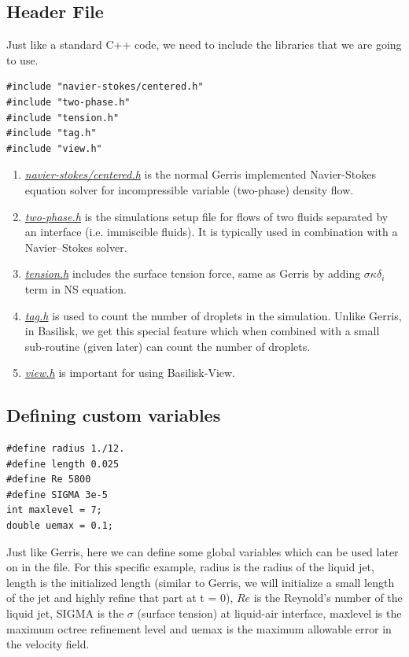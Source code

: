 \documentclass[]{article}
\newcommand\Colorhref[3][blue]{\href{#2}{\color{#1}#3}}
\begin{document}
\subsection{Header File}
Just like a standard C++ code, we need to include the libraries that we are going to use.
\begin{verbatim}
#include "navier-stokes/centered.h"
#include "two-phase.h"
#include "tension.h"
#include "tag.h"
#include "view.h"
\end{verbatim}
\begin{enumerate}
\item \Colorhref{http://basilisk.fr/src/navier-stokes/centered.h}{\textit{navier-stokes/centered.h}} is the normal Gerris implemented Navier-Stokes equation solver for incompressible variable (two-phase) density flow.
\item \Colorhref{http://basilisk.fr/src/two-phase.h}{\textit{two-phase.h}} is the simulations setup file for flows of two fluids separated by an interface (i.e. immiscible fluids). It is typically used in combination with a Navier–Stokes solver.
\item \Colorhref{http://basilisk.fr/src/tension.h}{\textit{tension.h}} includes the surface tension force, same as Gerris by adding $\sigma\kappa\delta_i$ term in NS equation.
\item \Colorhref{http://basilisk.fr/src/tag.h}{\textit{tag.h}} is used to count the number of droplets in the simulation. Unlike Gerris, in Basilisk, we get this special feature which when combined with a small sub-routine (given later) can count the number of droplets.
\item \Colorhref{http://basilisk.fr/src/view.h}{\textit{view.h}} is important for using Basilisk-View. 
\end{enumerate}
\subsection{Defining custom variables}
\begin{verbatim}
#define radius 1./12.
#define length 0.025
#define Re 5800
#define SIGMA 3e-5
int maxlevel = 7;
double uemax = 0.1;
\end{verbatim}
Just like Gerris, here we can define some global variables which can be used later on in the file. For this specific example, radius is the radius of the liquid jet, length is the initialized length (similar to Gerris, we will initialize a small length of the jet and highly refine that part at t = 0), $Re$ is the Reynold's number of the liquid jet, SIGMA is the $\sigma$ (surface tension) at liquid-air interface, maxlevel is the maximum octree refinement level and uemax is the maximum allowable error in the velocity field.
\end{document}
